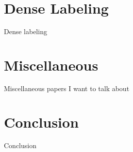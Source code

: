 \documentclass[10pt,twocolumn,letterpaper]{article}
\begin{document}
\section{Dense Labeling}

Dense labeling

\section{Miscellaneous}

Miscellaneous papers I want to talk about

\section{Conclusion}

Conclusion

{\small


}
\end{document}
